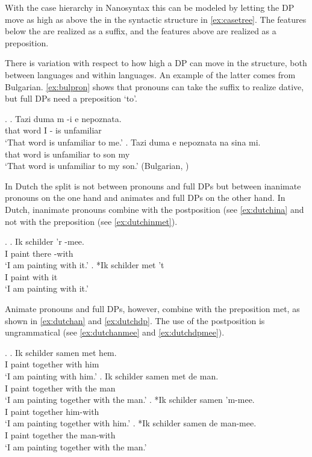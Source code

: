 \documentclass[12pt]{article}
\begin{document}
With the case hierarchy in Nanosyntax this can be modeled by letting the DP move as high as above the  in the syntactic structure in \ref{ex:casetree}. The features below the  are realized as a suffix, and the features above  are realized as a preposition.

There is variation with respect to how high a DP can move in the structure, both between languages and within languages. An example of the latter comes from Bulgarian. \ref{ex:bulpron} shows that pronouns can take the suffix  to realize dative, but full DPs need a preposition  `to'.

\ex.\label{ex:bulgarian}
\ag. Tazi duma m -i e nepoznata.\\
that word I - is unfamiliar\\
`That word is unfamiliar to me.'\label{ex:bulpron}
\bg. Tazi duma e nepoznata na sina mi.\\
that word is unfamiliar to son my\\
`That word is unfamiliar to my son.'\label{ex:buldpto} \hfill (Bulgarian, \citealt[39]{caha2009})

In Dutch the split is not between pronouns and full DPs but between inanimate pronouns on the one hand and animates and full DPs on the other hand. In Dutch, inanimate pronouns combine with the postposition  (see \ref{ex:dutchina} and not with the preposition  (see \ref{ex:dutchinmet}).

\ex.
\ag. Ik schilder 'r -mee.\\
 I paint there -with\\
 `I am painting with it.'\label{ex:dutchina}
\bg. *Ik schilder met 't\\
 I paint with it\\
 `I am painting with it.'\label{ex:dutchinmet}

Animate pronouns and full DPs, however, combine with the preposition met, as shown in \ref{ex:dutchan} and \ref{ex:dutchdp}. The use of the postposition  is ungrammatical (see \ref{ex:dutchanmee} and \ref{ex:dutchdpmee}).

\ex.
\ag. Ik schilder samen met hem.\\
 I paint together with him\\
 `I am painting with him.'\label{ex:dutchan}
\bg. Ik schilder samen met de man.\\
 I paint together with the man\\
 `I am painting together with the man.'\label{ex:dutchdp}
\bg. *Ik schilder samen 'm-mee.\\
 I paint together him-with\\
 `I am painting together with him.'\label{ex:dutchanmee}
\bg. *Ik schilder samen de man-mee.\\
 I paint together the man-with\\
 `I am painting together with the man.'\label{ex:dutchdpmee}
\end{document}
